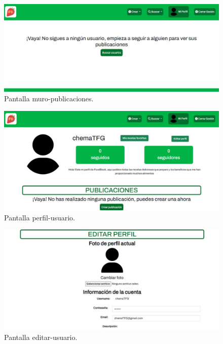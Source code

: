 \begin{figure}
  \centering
  \includegraphics[scale=0.30]{img/ma-muro-publicaciones.JPG}
  \caption{Pantalla muro-publicaciones.}
  \label{fig:ma-muro-publicaciones}
\end{figure}

\begin{figure}
  \centering
  \includegraphics[scale=0.30]{img/ma-perfil-usuario.JPG}
  \caption{Pantalla perfil-usuario.}
  \label{fig:ma-perfil-usuario}
\end{figure}

\begin{figure}
  \centering
  \includegraphics[scale=0.30]{img/ma-editar-perfil.JPG}
  \caption{Pantalla editar-usuario.}
  \label{fig:ma-editar-usuario}
\end{figure}

